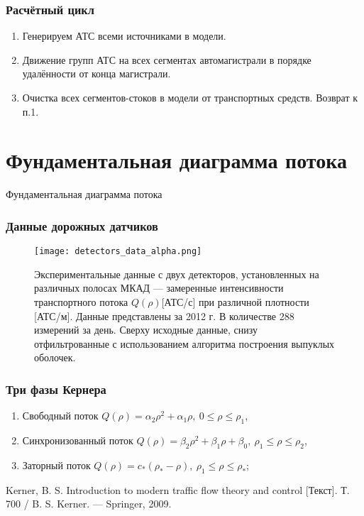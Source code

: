 \begin{frame}
    \frametitle{Расчётный цикл}
    \begin{enumerate}
      \item Генерируем АТС всеми источниками в модели.
      \item Движение групп АТС на всех сегментах автомагистрали в порядке удалённости от конца магистрали.
      \item Очистка всех сегментов-стоков в модели от транспортных средств. Возврат к п.1.
    \end{enumerate}
\end{frame}

\section{Фундаментальная диаграмма потока}
\begin{frame}
    \begin{center}
        \Huge
        Фундаментальная диаграмма потока
    \end{center}
\end{frame}

\begin{frame}
    \frametitle{Данные дорожных датчиков}
    \begin{figure}[ht]
        \begin{center}
            \texttt{[image: detectors\_data\_alpha.png]}
            \caption{Экспериментальные данные с двух детекторов, установленных на различных полосах МКАД --- замеренные интенсивности транспортного потока \(Q(\rho)\)[АТС/с] при различной плотности [АТС/м]. Данные представлены за 2012 г. В количестве 288 измерений за день. Сверху исходные данные, снизу отфильтрованные с использованием алгоритма построения выпуклых оболочек.}
        \end{center}
    \end{figure}
\end{frame}

\begin{frame}
    \frametitle{Три фазы Кернера}
    \begin{enumerate}
      \item Свободный поток \(Q(\rho) = \alpha_2\rho^2 + \alpha_1\rho,\ 0\leq\rho\leq\rho_1\),
      \item Синхронизованный поток \(Q(\rho) = \beta_2\rho^2 + \beta_1\rho + \beta_0,\ \rho_1\leq\rho\leq\rho_2\),
      \item Заторный поток \(Q(\rho) = c_*(\rho_*-\rho),\ \rho_1\leq\rho\leq\rho_*\);
    \end{enumerate}
    
    Kerner, B. S. Introduction to modern traffic flow theory and control [Текст]. Т. 700 / B. S. Kerner. — Springer, 2009.
\end{frame}

